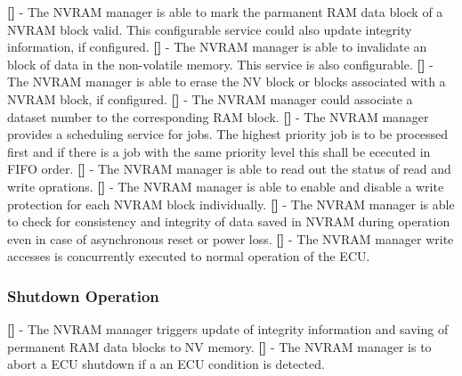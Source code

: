 {\bf []} - The \mbox{NVRAM} manager is able to mark the parmanent \mbox{RAM} data block of a \mbox{NVRAM} block valid. This configurable service could also update integrity information, if configured.\newline
\newline
{\bf []} - The \mbox{NVRAM} manager is able to invalidate an block of data in the non-volatile memory. This service is also configurable.\newline
\newline
{\bf []} - The \mbox{NVRAM} manager is able to erase the NV block or blocks associated with a \mbox{NVRAM} block, if configured.\newline
\newline
{\bf []} - The \mbox{NVRAM} manager  could associate a dataset number to the corresponding \mbox{RAM} block.\newline
\newline
{\bf []} - The \mbox{NVRAM} manager provides a scheduling service for jobs. The highest priority job is to be processed first and if there is a job with the same priority level this shall be ececuted in \mbox{FIFO} order.\newline
\newline
{\bf []} - The \mbox{NVRAM} manager is able to read out the status of read and write oprations.\newline
\newline
{\bf []} - The \mbox{NVRAM} manager is able to enable and disable a write protection for each \mbox{NVRAM} block individually.\newline
\newline
{\bf []} - The \mbox{NVRAM} manager is able to check for consistency and integrity of data saved in \mbox{NVRAM} during operation even in case of asynchronous reset or power loss.\newline
\newline
{\bf []} - The \mbox{NVRAM} manager write accesses is concurrently executed to normal operation of the \mbox{ECU}.\newline

\subsubsection{Shutdown Operation}
{\bf []} - The \mbox{NVRAM} manager triggers update of integrity information and saving of permanent \mbox{RAM} data blocks to \mbox{NV} memory.\newline
\newline
{\bf []} - The \mbox{NVRAM} manager is to abort a \mbox{ECU} shutdown if a an \mbox{ECU} condition is detected.\newline
